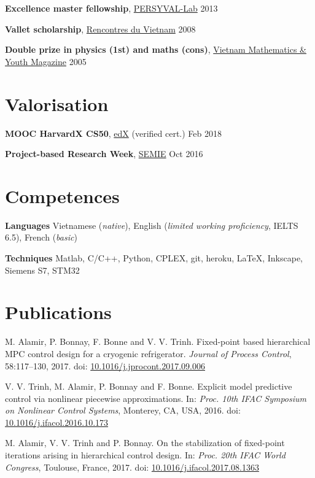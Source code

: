 \documentclass[a4paper,11pt]{article}
\begin{document}
  \textbf{Excellence master fellowship}, 
  \href{http://persyval-lab.org/}{PERSYVAL-Lab}
  \hfill {2013}

  \vspace{0.1cm}

  \textbf{Vallet scholarship}, 
  \href{http://vietnam.in2p3.fr/}{Rencontres du Vietnam}
  \hfill {2008}

  \vspace{0.1cm}

  \textbf{Double prize in physics (1st) and maths (cons)}, 
  \href{http://www.nxbgd.vn/toanhoctuoitre}{Vietnam Mathematics \& Youth Magazine}
  \hfill {2005}

  \section{Valorisation}

  \textbf{MOOC HarvardX CS50}, 
  \href{https://www.edx.org}{edX} (verified cert.)
  \hfill {Feb 2018}

  \vspace{0.1cm}

  \textbf{Project-based Research Week}, 
  \href{http://semie.imag.fr/}{SEMIE}
  \hfill {Oct 2016}

  \section{Competences}

  \textbf{Languages }
  Vietnamese (\emph{native}), English (\emph{limited working proficiency}, IELTS 6.5), French (\emph{basic})

  \vspace{0.1cm}

  \textbf{Techniques }
  Matlab, C/C++, Python, CPLEX, git, heroku, \LaTeX, Inkscape, Siemens S7, STM32

  \section{Publications}

  \begin{bibenum}

  \item M. Alamir, P. Bonnay, F. Bonne and V. V. Trinh.
    Fixed-point based hierarchical MPC control design for a cryogenic refrigerator. 
    \emph{Journal of Process Control}, 58:117--130, 2017.
    doi: \url{10.1016/j.jprocont.2017.09.006}

  \item V. V. Trinh, M. Alamir, P. Bonnay and F. Bonne. 
    Explicit model predictive control via nonlinear piecewise approximations.
    In: \emph{Proc. 10th IFAC Symposium on Nonlinear Control Systems}, Monterey, CA, USA, 2016.
    doi: \url{10.1016/j.ifacol.2016.10.173}

  \item M. Alamir, V. V. Trinh and P. Bonnay. 
    On the stabilization of fixed-point iterations arising in hierarchical control design.
    In: \emph{Proc. 20th IFAC World Congress}, Toulouse, France, 2017.
    doi: \url{10.1016/j.ifacol.2017.08.1363}

  \end{bibenum}


  
\end{document}
